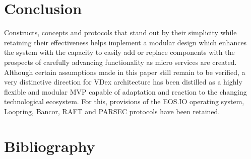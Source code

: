 \documentclass[]{article}
\begin{document}
\section{Conclusion}
Constructs, concepts and protocols that stand out by their simplicity
while retaining their effectiveness helps implement a modular
design which enhances the system with the capacity to easily add or replace components 
with the prospects of carefully advancing functionality as micro services are created.
Although certain assumptions made in this paper still remain to be verified,
a very distinctive direction for VDex architecture has been distilled as a highly flexible and modular MVP 
capable of adaptation and reaction to the changing technological ecosystem.
For this, provisions of the EOS.IO operating system, Loopring, Bancor, RAFT and PARSEC protocols have been retained. 

\section*{Bibliography}



\cite{1}
\cite{2}
\cite{3}
\cite{4}
\cite{5}
\cite{6}
\cite{7}
\cite{8}
\cite{9}
\cite{10}
\cite{11}
\cite{12}
\cite{13}
\cite{14}
\cite{15}
\cite{16}
\cite{17}
\cite{18}
\cite{19}
\cite{20}
\cite{21}


 
\end{document}
